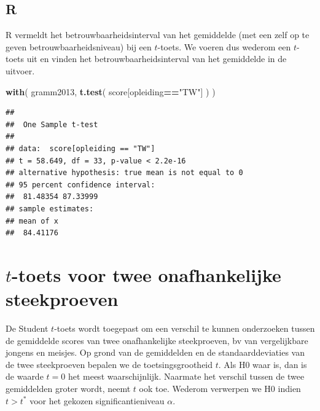 \documentclass[
]{book}
\newenvironment{Shaded}{\begin{snugshade}}{\end{snugshade}}
\newcommand{\KeywordTok}[1]{\textcolor[rgb]{0.13,0.29,0.53}{\textbf{#1}}}
\newcommand{\NormalTok}[1]{#1}
\newcommand{\OperatorTok}[1]{\textcolor[rgb]{0.81,0.36,0.00}{\textbf{#1}}}
\newcommand{\StringTok}[1]{\textcolor[rgb]{0.31,0.60,0.02}{#1}}
\begin{document}
\hypertarget{r-12}{%
\subsection{R}\label{r-12}}

R vermeldt het betrouwbaarheidsinterval van het gemiddelde (met een zelf
op te geven betrouwbaarheidsniveau) bij een \(t\)-toets. We voeren dus wederom een \(t\)-toets
uit en vinden het betrouwbaarheidsinterval van het gemiddelde in de
uitvoer.

\begin{Shaded}
\begin{Highlighting}[]
\KeywordTok{with}\NormalTok{( gramm2013, }\KeywordTok{t.test}\NormalTok{( score[opleiding}\OperatorTok{==}\StringTok{"TW"}\NormalTok{] ) )}
\end{Highlighting}
\end{Shaded}

\begin{verbatim}
## 
##  One Sample t-test
## 
## data:  score[opleiding == "TW"]
## t = 58.649, df = 33, p-value < 2.2e-16
## alternative hypothesis: true mean is not equal to 0
## 95 percent confidence interval:
##  81.48354 87.33999
## sample estimates:
## mean of x 
##  84.41176
\end{verbatim}

\hypertarget{sec:ttoets-onafh}{%
\section{\texorpdfstring{\(t\)-toets voor twee onafhankelijke steekproeven}{t-toets voor twee onafhankelijke steekproeven}}\label{sec:ttoets-onafh}}

De Student \(t\)-toets wordt toegepast om een verschil te kunnen onderzoeken tussen
de gemiddelde scores van twee onafhankelijke steekproeven, bv van
vergelijkbare jongens en meisjes. Op grond van de gemiddelden en de
standaarddeviaties van de twee steekproeven bepalen we de
toetsingsgrootheid \(t\). Als H0 waar is, dan is de waarde \(t=0\) het meest
waarschijnlijk. Naarmate het verschil tussen de twee gemiddelden groter
wordt, neemt \(t\) ook toe. Wederom verwerpen we H0 indien \(t>t^*\) voor
het gekozen significantieniveau \(\alpha\).
\end{document}
